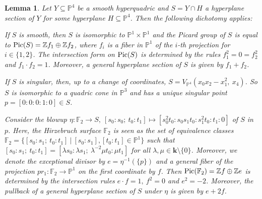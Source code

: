 \documentclass[english,11pt,reqno]{amsart}
\newcommand{\sub}{\subseteq}
\newcommand{\Pone}{\mathbb{P}^1}
\newcommand{\Pthree}{\mathbb{P}^3}
\newcommand{\Pfour}{\mathbb{P}^4}
\newcommand{\PxP}{\mathbb{P}^1 \times \mathbb{P}^1}
\newcommand{\VPfour}{V_{\Pfour}}
\newcommand{\kk}{\mathbf{k}}
\newcommand{\Z}{\mathbb{Z}}
\newcommand{\Pic}{\textup{Pic}}
\newcommand{\Ftwo}{\mathbb{F}_2}
\newtheorem{lem}[thm]{Lemma}
\begin{document}
\begin{lem} \label{lem:quadric_surface_in_P4}
Let $Y\sub \Pfour$ be a smooth hyperquadric and $S=Y\cap H$ a hyperplane section of $Y$ for some hyperplane $H\sub \Pfour$. Then the following dichotomy applies:
\begin{enumlem}
\item If $S$ is smooth, then $S$ is isomorphic to $\PxP$ and the Picard group of $S$ is equal to $\Pic(S) = \Z f_1 \oplus \Z f_2$, where $f_i$ is a fiber in $\Pone$ of the $i$-th projection for $i\in \{1,2\}$. The intersection form on $\Pic(S)$ is determined by the rules $f_1^2 = 0 = f_2^2$ and $f_1\cdot f_2 =1$. Moreover, a general hyperplane section of $S$ is given by $f_1+f_2$. \label{lem:smooth_quadric_surface_in_P4}
%
\item If $S$ is singular, then, up to a change of coordinates, $S=\VPfour(x_0x_2-x_1^2,\:x_4)$. So $S$ is isomorphic to a quadric cone in $\Pthree$ and has a unique singular point $p=[0:0:0:1:0]\in S$. \par
Consider the blowup $\eta: \Ftwo \rightarrow S, \: [s_0:s_0;\:t_0:t_1] \mapsto [s_0^2t_0:s_0s_1t_0:s_1^2t_0:t_1:0]$ of $S$ in $p$. Here, the Hirzebruch surface $\Ftwo$ is seen as the set of equivalence classes $\Ftwo = \{[s_0:s_1;\:t_0:t_1] \: | \: [s_0:s_1], [t_0:t_1]\in\Pone\}$ such that $[s_0:s_1;\:t_0:t_1] = [\lambda s_0:\lambda s_1;\:\lambda^{-2} \mu t_0: \mu t_1]$  for all $\lambda, \mu \in \kk \setminus \{0\}$. Moreover, we denote the exceptional divisor by $e=\eta^{-1}(\{p\})$ and a general fiber of the projection $pr_1:\Ftwo \rightarrow \Pone$ on the first coordinate by $f$. Then $\Pic(\Ftwo)=\Z f \oplus \Z e$ is determined by the intersection rules $e \cdot f = 1, \: f^2 = 0$ and $e^2 = -2$. Moreover, the pullback of a general hyperplane section of $S$ under $\eta$ is given by $e+2f$.
\label{lem:singular_quadric_surface_in_P4}
\end{enumlem}
\end{lem}
%
%
\end{document}
